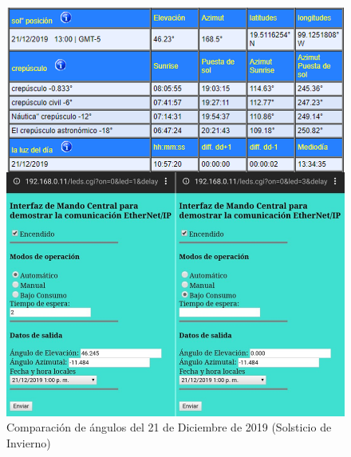 \begin{figure}[H]
	\centering
	\includegraphics[width=\columnwidth]{imagenes/VAL_I}
	\caption{Comparación de ángulos del 21 de Diciembre de 2019 (Solsticio de Invierno)}
	\label{fig:VAL_I}
\end{figure}

